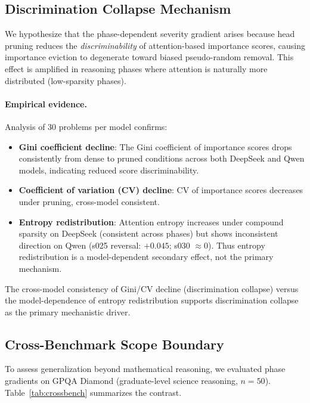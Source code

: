 \documentclass[11pt,a4paper]{article}
\begin{document}
\subsection{Discrimination Collapse Mechanism}
\label{sec:mechanism}

We hypothesize that the phase-dependent severity gradient arises because head pruning reduces the \emph{discriminability} of attention-based importance scores, causing importance eviction to degenerate toward biased pseudo-random removal. This effect is amplified in reasoning phases where attention is naturally more distributed (low-sparsity phases).

\paragraph{Empirical evidence.} Analysis of 30 problems per model confirms:
\begin{itemize}
\item \textbf{Gini coefficient decline}: The Gini coefficient of importance scores drops consistently from dense to pruned conditions across both DeepSeek and Qwen models, indicating reduced score discriminability.
\item \textbf{Coefficient of variation (CV) decline}: CV of importance scores decreases under pruning, cross-model consistent.
\item \textbf{Entropy redistribution}: Attention entropy increases under compound sparsity on DeepSeek (consistent across phases) but shows inconsistent direction on Qwen (s025 reversal: $+0.045$; s030 $\approx 0$). Thus entropy redistribution is a model-dependent secondary effect, not the primary mechanism.
\end{itemize}

The cross-model consistency of Gini/CV decline (discrimination collapse) versus the model-dependence of entropy redistribution supports discrimination collapse as the primary mechanistic driver.

\subsection{Cross-Benchmark Scope Boundary}
\label{sec:scope}

To assess generalization beyond mathematical reasoning, we evaluated phase gradients on GPQA Diamond (graduate-level science reasoning, $n = 50$). Table~\ref{tab:crossbench} summarizes the contrast.
\end{document}
